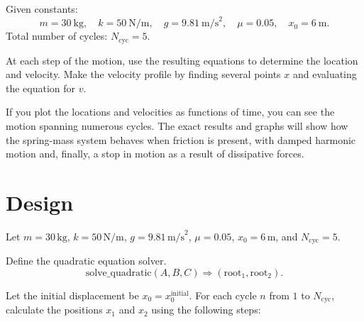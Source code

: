 \documentclass[12pt, a4paper, oneside]{report}
\begin{document}
Given constants:
\[
	m = 30 \ \text{kg}, \quad k = 50 \ \text{N/m}, \quad g = 9.81 \ \text{m/s}^2, \quad \mu = 0.05, \quad x_0 = 6 \ \text{m}.
\]
Total number of cycles: \( N_{\text{cyc}} = 5 \).


At each step of the motion, use the resulting equations to determine the location and velocity. Make the velocity profile by finding several points \( x \) and evaluating the equation for \( v \).

If you plot the locations and velocities as functions of time, you can see the motion spanning numerous cycles. The exact results and graphs will show how the spring-mass system behaves when friction is present, with damped harmonic motion and, finally, a stop in motion as a result of dissipative forces.



\section{Design}

Let \( m = 30 \, \text{kg} \), \( k = 50 \, \text{N/m} \), \( g = 9.81 \, \text{m/s}^2 \), \( \mu = 0.05 \), \( x_0 = 6 \, \text{m} \), and \( N_{\text{cyc}} = 5 \).

Define the quadratic equation solver.
\[
	\text{solve\_quadratic}(A, B, C) \Rightarrow (\text{root}_1, \text{root}_2).
\]

Let the initial displacement be \( x_0 = x_0^{\text{initial}} \). For each cycle \( n \) from \( 1 \) to \( N_{\text{cyc}} \), calculate the positions \( x_1 \) and \( x_2 \) using the following steps:
\end{document}
